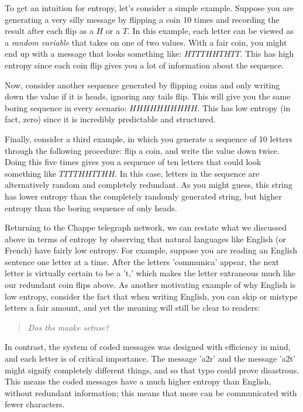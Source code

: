 \documentclass[UTF8]{book}
\begin{document}
\begin{CJK}{UTF8}{gbsn}
To get an intuition for entropy, let's consider a simple example. Suppose you are generating a very silly message by flipping a coin 10 times and recording the result after each flip as a $H$ or a $T$. In this example, each letter can be viewed as a \emph{random variable} that takes on one of two values. With a fair coin, you might end up with a message that looks something like: $HTTTHHTHTT$. This has high entropy since each coin flip gives you a lot of information about the sequence.

Now, consider another sequence generated by flipping coins and only writing down the value if it is heads, ignoring any tails flip. This will give you the same boring sequence in every scenario: $HHHHHHHHHH$. This has low entropy (in fact, zero) since it is incredibly predictable and structured.

Finally, consider a third example, in which you generate a sequence of 10 letters through the following procedure: flip a coin, and write the value down twice. Doing this five times gives you a sequence of ten letters that could look something like $TTTTHHTTHH$. In this case, letters in the sequence are alternatively random and completely redundant. As you might guess, this string has lower entropy than the completely randomly generated string, but higher entropy than the boring sequence of only heads.

Returning to the Chappe telegraph network, we can restate what we discussed above in terms of entropy by observing that natural languages like English (or French) have fairly low entropy. For example, suppose you are reading an English sentence one letter at a time. After the letters 'communica' appear, the next letter is virtually certain to be a 't,' which makes the letter extraneous much like our redundant coin flips above. As another motivating example of why English is low entropy, consider the fact that when writing English, you can skip or mistype letters a fair amount, and yet the meaning will still be clear to readers:

\begin{quotation}
\centering
\emph{Dos ths maake setnse?}
\end{quotation}

In contrast, the system of coded messages was designed with efficiency in mind, and each letter is of critical importance. The message 'a2r' and the message 'a2t' might signify completely different things, and so that typo could prove disastrous. This means the coded messages have a much higher entropy than English, without redundant information; this means that more can be communicated with fewer characters.


\end{CJK}
\end{document}
